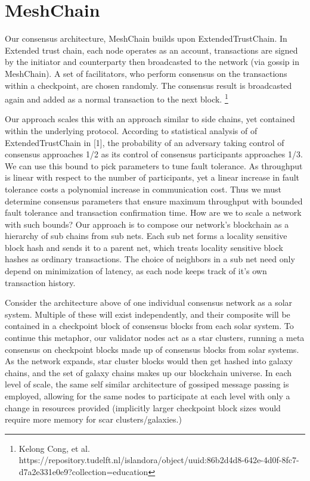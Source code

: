 \documentclass{article}
\begin{document}
\section{MeshChain}
Our consensus architecture, MeshChain builds upon ExtendedTrustChain. In Extended trust chain, each node operates as an account, transactions are signed by the initiator and counterparty then broadcasted to the network (via gossip in MeshChain). A set of facilitators, who perform consensus on the transactions within a checkpoint, are chosen randomly. The consensus result is broadcasted again and added as a normal transaction to the next block. \footnote{Kelong Cong, et al. https://repository.tudelft.nl/islandora/object/uuid:86b2d4d8-642e-4d0f-8fc7-d7a2e331e0e9?collection=education} 

Our approach scales this with an approach similar to side chains, yet contained within the underlying protocol. According to statistical analysis of of ExtendedTrustChain in [1], the probability of an adversary taking control of consensus approaches 1/2 as its control of consensus participants approaches 1/3. We can use this bound to pick parameters to tune fault tolerance. As throughput is linear with respect to the number of participants, yet a linear increase in fault tolerance costs a polynomial increase in communication cost. Thus we must determine consensus parameters that ensure maximum throughput with bounded fault tolerance and transaction confirmation time. How are we to scale a network with such bounds? Our approach is to compose our network's blockchain as a hierarchy of sub chains from sub nets. Each sub net forms a locality sensitive block hash and sends it to a parent net, which treats locality sensitive block hashes as ordinary transactions. The choice of neighbors in a sub net need only depend on minimization of latency, as each node keeps track of it's own transaction history.

Consider the architecture above of one individual consensus network as a solar system. Multiple of these will exist independently, and their composite will be contained in a checkpoint block of consensus blocks from each solar system. To continue this metaphor, our validator nodes act as a star clusters, running a meta consensus on checkpoint blocks made up of  consensus blocks from solar systems. As the network expands, star cluster blocks would then get hashed into galaxy chains, and the set of galaxy chains makes up our blockchain universe. In each level of scale, the same self similar architecture of gossiped message passing is employed, allowing for the same nodes to participate at each level with only a change in resources provided (implicitly larger checkpoint block sizes would require more memory for scar clusters/galaxies.)
\end{document}
